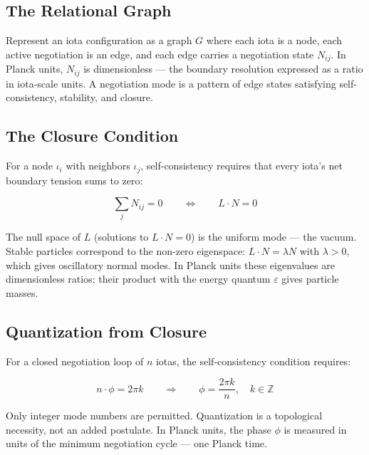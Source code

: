 \documentclass[11pt,letterpaper]{article}
\begin{document}
\subsection{The Relational Graph}
\label{sec:orgf283049}

Represent an iota configuration as a graph \(G\) where each iota is a node, each active negotiation is an edge, and each edge carries a negotiation state \(N_{ij}\). In Planck units, \(N_{ij}\) is dimensionless --- the boundary resolution expressed as a ratio in iota-scale units. A negotiation mode is a pattern of edge states satisfying self-consistency, stability, and closure.

\subsection{The Closure Condition}
\label{sec:org82c3be2}

For a node \(\iota_i\) with neighbors \(\iota_j\), self-consistency requires that every iota's net boundary tension sums to zero:

\begin{equation}
\sum_j N_{ij} = 0 \qquad \Longleftrightarrow \qquad L \cdot N = 0
\end{equation}

The null space of \(L\) (solutions to \(L \cdot N = 0\)) is the uniform mode --- the vacuum. Stable particles correspond to the non-zero eigenspace: \(L \cdot N = \lambda N\) with \(\lambda > 0\), which gives oscillatory normal modes. In Planck units these eigenvalues are dimensionless ratios; their product with the energy quantum \(\varepsilon\) gives particle masses.

\subsection{Quantization from Closure}
\label{sec:org98c1a02}

For a closed negotiation loop of \(n\) iotas, the self-consistency condition requires:

\begin{equation}
n \cdot \phi = 2\pi k \qquad \Longrightarrow \qquad \phi = \frac{2\pi k}{n},\quad k \in \mathbb{Z}
\end{equation}

Only integer mode numbers are permitted. Quantization is a topological necessity, not an added postulate. In Planck units, the phase \(\phi\) is measured in units of the minimum negotiation cycle --- one Planck time.
\end{document}
